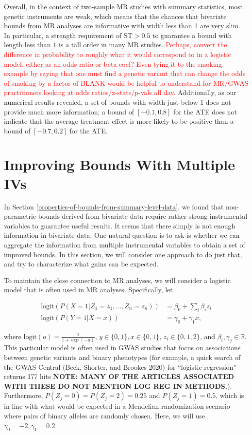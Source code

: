 \documentclass[
]{article}
\theoremstyle{plain}
\begin{document}
Overall, in the context of two-sample MR studies with summary statistics, most genetic instruments are weak, which means that the chances that bivariate bounds from MR analyses are informative with width less than 1 are very slim. In particular, a strength requirement of $\text{ST} > 0.5$ to guarantee a bound with length less than $1$ is a tall order in many MR studies. \textcolor{red}{Perhaps, convert the difference in probability to roughly what it would correspond to in a logistic model, either as an odds ratio or beta coef? Even tying it to the smoking example by saying that one must find a genetic variant that can change the odds of smoking by a factor of BLANK would be helpful to understand for MR/GWAS practitioners looking at odds ratios/z-stats/p-vals all day.} Additionally, as our numerical results revealed, a set of bounds with width just below 1 does not provide much more information; a bound of \([-0.1, 0.8]\) for the ATE does not indicate that the average treatment effect is more likely to be positive than a bound of \([-0.7, 0.2]\) for the ATE.

\hypertarget{improving-bounds-with-multiple-ivs}{%
\section{Improving Bounds With Multiple IVs}\label{improving-bounds-with-multiple-ivs}}

In Section \ref{properties-of-bounds-from-summary-level-data}, we found that non-parametric bounds derived from bivariate data require rather strong instrumental variables to guarantee useful results. It seems that there simply is not enough information in bivariate data. One natural question is to ask is whether we can aggregate the information from multiple instrumental variables to obtain a set of improved bounds. In this section, we will consider one approach to do just that, and try to characterize what gains can be expected.

To maintain the close connection to MR analyses, we will consider a logistic model that is often used in MR analyses. Specifically, let

\[\begin{aligned}
\text{logit}(P(X = 1 | Z_1 = z_1, ..., Z_n = z_n)) &= \beta_0 + \sum_i \beta_i z_i \\
\text{logit}(P(Y = 1 | X = x)) &= \gamma_0 + \gamma_1 x,
\end{aligned}\]

where \(\text{logit}(a) = \frac{1}{1 + \exp(-a)}\), \(y \in \{0,1\}, x \in \{0,1\}\), \(z_i \in \{0, 1, 2\}\), and \(\beta_i, \gamma_j \in \mathbb{R}\). This particular model is often used in GWAS studies that focus on associations between genetic variants and binary phenotypes (for example, a quick search of the GWAS Central (Beck, Shorter, and Brookes 2020) for ``logistic regression'' returns 177 hits \textbf{NOTE: MANY OF THE ARTICLES ASSOCIATED WITH THESE DO NOT MENTION LOG REG IN METHODS.}). Furthermore, \(P(Z_j = 0) = P(Z_j = 2) = 0.25\) and \(P(Z_j = 1) = 0.5\), which is in line with what would be expected in a Mendelian randomization scenario where pairs of binary alleles are randomly chosen. Here, we will use \(\gamma_0 = -2, \gamma_1 = 0.2\).
\end{document}
